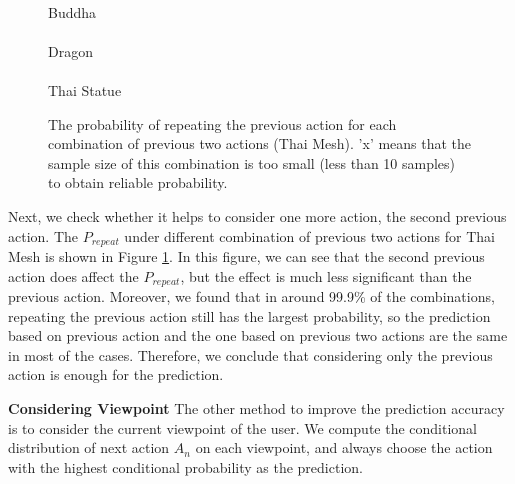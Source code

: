 \begin{figure}
    \centering
    \\
    Buddha\\
    \\
    Dragon\\
    \\
    Thai Statue
    \caption[The probability of repeating the previous action for each combination of previous two actions (Thai Mesh).]
    {The probability of repeating the previous action for each combination of previous two actions (Thai Mesh).
    'x' means that the sample size of this combination is too small (less than 10 samples) to obtain reliable probability.}
    \label{f:user:prev2}
\end{figure}
Next, we check whether it helps to consider one more action, the second previous action. 
The $P_{repeat}$ under different combination of
previous two actions for Thai Mesh is shown in Figure \ref{f:user:prev2}.
In this figure, we can see that the second previous action does affect the 
$P_{repeat}$, but the effect is much less significant than the previous action. 
Moreover, we found that in around 99.9\% of the combinations, 
repeating the previous action still has the largest probability,
so the prediction based on previous action and the one based on previous two actions are the same in
most of the cases. 
Therefore, we conclude that considering only the previous action is enough for the prediction.

\textbf{Considering Viewpoint} 
The other method to improve the prediction accuracy is to consider the current viewpoint of the user.
We compute the conditional distribution of next action $A_n$ on each viewpoint, 
and always choose the action with the highest conditional probability as the prediction.

